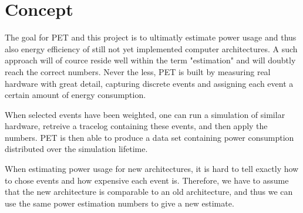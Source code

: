 \section{Concept}
The goal for PET and this project is to ultimatly estimate power usage and thus also
energy efficiency of still not yet implemented computer architectures. A such approach
will of cource reside well within the term "estimation" and will doubtly reach the correct
numbers. Never the less, PET is built by measuring real hardware with great detail, capturing
discrete events and assigning each event a certain amount of energy consumption.

When selected events have been weighted, one can run a simulation of similar hardware, retreive
a tracelog containing these events, and then apply the numbers. PET is then able to produce a data set
containing power consumption distributed over the simulation lifetime.

When estimating power usage for new architectures, it is hard to tell exactly how to chose events and
how expensive each event is. Therefore, we have to assume that the new architecture is comparable to
an old architecture, and thus we can use the same power estimation numbers to give a new estimate.
